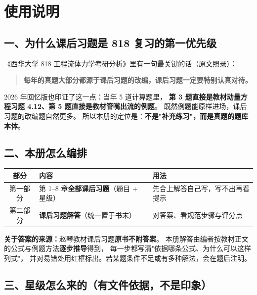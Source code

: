 \chapter*{使用说明}

\section*{一、为什么课后习题是 818 复习的第一优先级}

《西华大学 818 工程流体力学考研分析》里有一句最关键的话（原文照录）：

\begin{quote}
\textbf{每年的真题大部分都源于课后习题的改编，课后习题一定要特别认真对待。}
\end{quote}

2026 年回忆版也印证了这一点：当年 5 道计算题里，
\textbf{第 3 题直接是教材动量方程习题 4.12、第 5 题直接是教材管嘴出流的例题}。
既然例题能原样进场，课后习题的改编题自然更多。
所以本册的定位是：\textbf{不是"补充练习"，而是真题的题库本体}。

\section*{二、本册怎么编排}

\begin{center}
\begin{tabularx}{\textwidth}{@{}clX@{}}
\toprule
部分 & 内容 & 用法 \\
\midrule
第一部分 & 第 1--8 章\textbf{全部课后习题}（题目 + 星级） & 先合上解答自己写，写不出再看提示 \\
第二部分 & \textbf{课后习题解答}（统一置于书末） & 对答案、看规范步骤与评分点 \\
\bottomrule
\end{tabularx}
\end{center}

\noindent\textbf{关于答案的来源：}赵琴教材课后习题\textbf{原书不附答案}。
本册解答由编者按教材正文的公式与例题方法\textbf{逐步推导}得到，
每一步都写清"依据哪条公式、为什么可以这样列式"，
并对易错处用红框标出。若某题条件不足或有多种解法，会在题后注明。

\section*{三、星级怎么来的（有文件依据，不是印象）}

